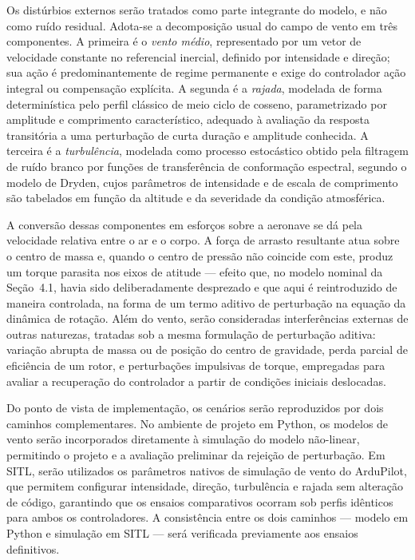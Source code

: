 \documentclass[12pt,a4paper]{article}
\begin{document}
Os distúrbios externos serão tratados como parte integrante do modelo, e não como
ruído residual. Adota-se a decomposição usual do campo de vento em três componentes.
A primeira é o \emph{vento médio}, representado por um vetor de velocidade constante
no referencial inercial, definido por intensidade e direção; sua ação é
predominantemente de regime permanente e exige do controlador ação integral ou
compensação explícita. A segunda é a \emph{rajada}, modelada de forma determinística
pelo perfil clássico de meio ciclo de cosseno, parametrizado por amplitude e
comprimento característico, adequado à avaliação da resposta transitória a uma
perturbação de curta duração e amplitude conhecida. A terceira é a \emph{turbulência},
modelada como processo estocástico obtido pela filtragem de ruído branco por funções
de transferência de conformação espectral, segundo o modelo de Dryden, cujos
parâmetros de intensidade e de escala de comprimento são tabelados em função da
altitude e da severidade da condição atmosférica.

A conversão dessas componentes em esforços sobre a aeronave se dá pela velocidade
relativa entre o ar e o corpo. A força de arrasto resultante atua sobre o centro de
massa e, quando o centro de pressão não coincide com este, produz um torque parasita
nos eixos de atitude --- efeito que, no modelo nominal da Seção~4.1, havia sido
deliberadamente desprezado e que aqui é reintroduzido de maneira controlada, na forma
de um termo aditivo de perturbação na equação da dinâmica de rotação. Além do vento,
serão consideradas interferências externas de outras naturezas, tratadas sob a mesma
formulação de perturbação aditiva: variação abrupta de massa ou de posição do centro
de gravidade, perda parcial de eficiência de um rotor, e perturbações impulsivas de
torque, empregadas para avaliar a recuperação do controlador a partir de condições
iniciais deslocadas.

Do ponto de vista de implementação, os cenários serão reproduzidos por dois caminhos
complementares. No ambiente de projeto em Python, os modelos de vento serão
incorporados diretamente à simulação do modelo não-linear, permitindo o projeto e a
avaliação preliminar da rejeição de perturbação. Em SITL, serão utilizados os
parâmetros nativos de simulação de vento do ArduPilot, que permitem configurar
intensidade, direção, turbulência e rajada sem alteração de código, garantindo que os
ensaios comparativos ocorram sob perfis idênticos para ambos os controladores. A
consistência entre os dois caminhos --- modelo em Python e simulação em SITL --- será
verificada previamente aos ensaios definitivos.
\end{document}
